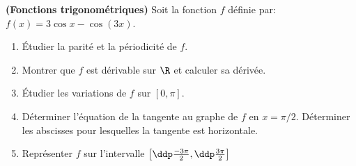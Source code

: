 
\begin{exercice}  \;
\textbf{(Fonctions trigonom\'etriques)}
Soit la fonction $f$ d\'efinie par: $f(x)=3\cos x-\cos (3x)$.
\begin{enumerate}
\item \'Etudier la parité et la périodicité de $f$.
\item Montrer que $f$ est dérivable sur $\R$ et calculer sa
dérivée.
\item \'Etudier les variations de $f$ sur $[0,\pi]$.
\item Déterminer l'équation de la tangente au graphe de $f$ en
$x=\pi/2$. Déterminer les abscisses pour lesquelles la tangente est
horizontale. \item Représenter $f$ sur l'intervalle
$\left\lbrack \ddp\frac{-3\pi}{2},\ddp\frac{3\pi}{2}\right\rbrack$ \end{enumerate}
\end{exercice}